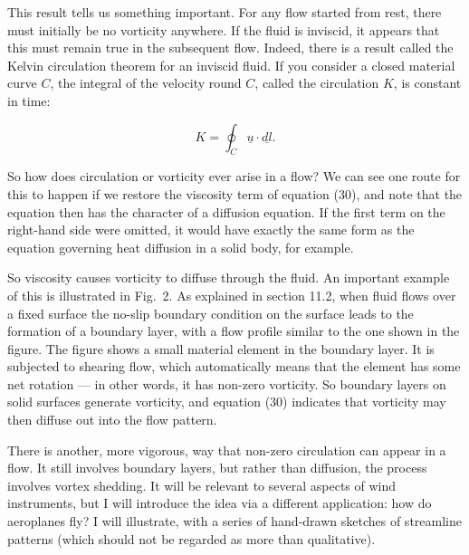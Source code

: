   This result tells us something important. For any flow started from rest, 
  there must initially be no vorticity anywhere. If the fluid is inviscid, it 
  appears that this must remain true in the subsequent flow. Indeed, there is a 
  result called the Kelvin circulation theorem for an inviscid fluid. If you 
  consider a closed material curve $C$, the integral of the velocity round $C$, 
  called the circulation $K$, is constant in time: 

  \begin{equation*}K=\oint_C{\underline{u} \cdot \underline{dl}} . 
  \tag{32}\end{equation*} 

  So how does circulation or vorticity ever arise in a flow? We can see one 
  route for this to happen if we restore the viscosity term of equation (30), 
  and note that the equation then has the character of a diffusion equation. If 
  the first term on the right-hand side were omitted, it would have exactly the 
  same form as the equation governing heat diffusion in a solid body, for 
  example. 

  So viscosity causes vorticity to diffuse through the fluid. An important 
  example of this is illustrated in Fig.\ 2. As explained in section 11.2, when 
  fluid flows over a fixed surface the no-slip boundary condition on the 
  surface leads to the formation of a boundary layer, with a flow profile 
  similar to the one shown in the figure. The figure shows a small material 
  element in the boundary layer. It is subjected to shearing flow, which 
  automatically means that the element has some net rotation --- in other 
  words, it has non-zero vorticity. So boundary layers on solid surfaces 
  generate vorticity, and equation (30) indicates that vorticity may then 
  diffuse out into the flow pattern. 


  There is another, more vigorous, way that non-zero circulation can appear in 
  a flow. It still involves boundary layers, but rather than diffusion, the 
  process involves vortex shedding. It will be relevant to several aspects of 
  wind instruments, but I will introduce the idea via a different application: 
  how do aeroplanes fly? I will illustrate, with a series of hand-drawn 
  sketches of streamline patterns (which should not be regarded as more than 
  qualitative). 


